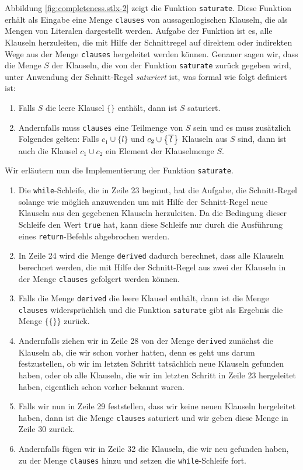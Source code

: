 Abbildung \ref{fig:completeness.stlx-2} zeigt die Funktion \texttt{saturate}.  Diese Funktion erh\"{a}lt
als Eingabe eine Menge \texttt{clauses} von aus\-sagenlogischen Klauseln, die als Mengen von Literalen
dargestellt werden.  Aufgabe der Funktion ist es, alle Klauseln herzuleiten, die mit Hilfe der
Schnittregel auf direktem oder indirekten Wege aus der Menge \texttt{clauses} hergeleitet werden
k\"{o}nnen.  Genauer sagen wir, dass die Menge $S$ der Klauseln, die von der Funktion \texttt{saturate}
zur\"{u}ck gegeben wird, unter Anwendung der Schnitt-Regel \emph{\color{blue}saturiert} ist, was formal wie folgt
definiert ist:
\begin{enumerate}
\item Falls $S$ die leere Klausel $\{\}$ enth\"{a}lt, dann ist $S$ saturiert.
\item Andernfalls muss \texttt{clauses} eine Teilmenge von $S$ sein und es muss zus\"{a}tzlich Folgendes
      gelten: Falls $c_1 \cup \{ l \}$ und  $c_2 \cup \bigl\{ \overline{\,l\,} \bigr\}$ Klauseln aus $S$
      sind, dann ist auch die Klausel $c_1 \cup c_2$ ein Element der Klauselmenge $S$.
\end{enumerate}
Wir erl\"{a}utern nun die Implementierung der Funktion \texttt{saturate}.
\begin{enumerate}
\item Die \texttt{while}-Schleife, die in Zeile 23 beginnt, hat die Aufgabe, die Schnitt-Regel
      solange wie m\"{o}glich anzuwenden um mit Hilfe der Schnitt-Regel neue Klauseln aus den gegebenen
      Klauseln herzuleiten.  Da die Bedingung dieser Schleife den Wert \texttt{true} hat, kann diese
      Schleife nur durch die Ausf\"{u}hrung eines \texttt{return}-Befehls abgebrochen werden.
\item In Zeile 24 wird die Menge \texttt{derived} dadurch berechnet, dass alle Klauseln berechnet
      werden, die mit Hilfe der Schnitt-Regel aus zwei der Klauseln in der Menge \texttt{clauses} 
      gefolgert werden k\"{o}nnen.
\item Falls die Menge \texttt{derived} die leere Klausel enth\"{a}lt, dann ist die Menge
      \texttt{clauses} widerspr\"{u}chlich und die Funktion \texttt{saturate} gibt als Ergebnis die
      Menge $\bigl\{ \{\} \bigr\}$ zur\"{u}ck.
\item Andernfalls ziehen wir in Zeile 28 von der Menge \texttt{derived} zun\"{a}chst die Klauseln ab, die wir schon
      vorher hatten, denn es geht uns darum festzustellen, ob wir im letzten Schritt tats\"{a}chlich
      neue Klauseln gefunden haben, oder ob alle Klauseln, die wir im letzten Schritt in Zeile 23
      hergeleitet haben, eigentlich schon vorher  bekannt  waren.
\item Falls wir nun in Zeile 29 feststellen, dass wir keine neuen Klauseln hergeleitet haben,
      dann ist die Menge \texttt{clauses} saturiert und wir geben diese Menge in Zeile 30 zur\"{u}ck.
\item Andernfalls f\"{u}gen wir in Zeile 32 die Klauseln, die wir neu gefunden haben, zu der Menge
      \texttt{clauses} hinzu und setzen die \texttt{while}-Schleife fort.
\end{enumerate}
